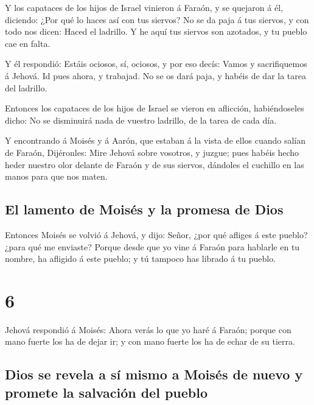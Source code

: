  Y los capataces de los hijos de Israel vinieron á
Faraón, y se quejaron á él, diciendo: ¿Por qué lo haces así con tus
siervos?  No se da paja á tus siervos, y con todo nos
dicen: Haced el ladrillo. Y he aquí tus siervos son azotados, y tu
pueblo cae en falta.

 Y él respondió: Estáis ociosos, sí, ociosos, y por eso
decís: Vamos y sacrifiquemos á Jehová.  Id pues ahora, y
trabajad. No se os dará paja, y habéis de dar la tarea del ladrillo.

 Entonces los capataces de los hijos de Israel se vieron
en aflicción, habiéndoseles dicho: No se disminuirá nada de vuestro
ladrillo, de la tarea de cada día.

 Y encontrando á Moisés y á Aarón, que estaban á la vista
de ellos cuando salían de Faraón,  Dijéronles: Mire
Jehová sobre vosotros, y juzgue; pues habéis hecho heder nuestro olor
delante de Faraón y de sus siervos, dándoles el cuchillo en las manos
para que nos maten.

\hypertarget{el-lamento-de-moisuxe9s-y-la-promesa-de-dios}{%
\subsection{El lamento de Moisés y la promesa de
Dios}\label{el-lamento-de-moisuxe9s-y-la-promesa-de-dios}}

 Entonces Moisés se volvió á Jehová, y dijo: Señor, ¿por
qué afliges á este pueblo? ¿para qué me enviaste?  Porque
desde que yo vine á Faraón para hablarle en tu nombre, ha afligido á
este pueblo; y tú tampoco has librado á tu pueblo.

\hypertarget{section-5}{%
\section{6}\label{section-5}}

 Jehová respondió á Moisés: Ahora verás lo que yo haré á
Faraón; porque con mano fuerte los ha de dejar ir; y con mano fuerte los
ha de echar de su tierra.

\hypertarget{dios-se-revela-a-suxed-mismo-a-moisuxe9s-de-nuevo-y-promete-la-salvaciuxf3n-del-pueblo}{%
\subsection{Dios se revela a sí mismo a Moisés de nuevo y promete la
salvación del
pueblo}\label{dios-se-revela-a-suxed-mismo-a-moisuxe9s-de-nuevo-y-promete-la-salvaciuxf3n-del-pueblo}}


